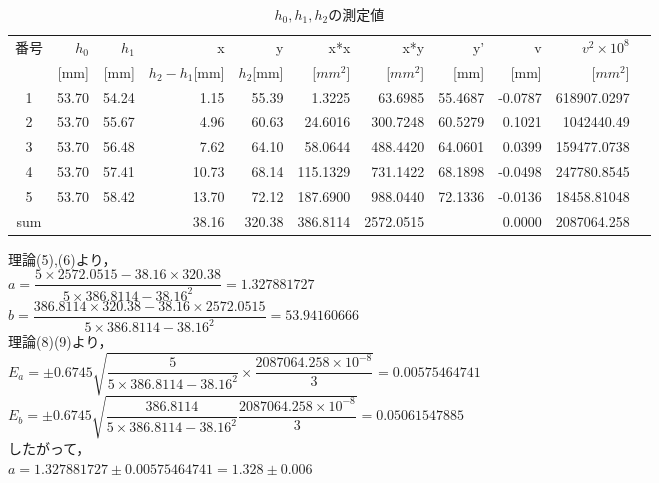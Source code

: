 \documentclass[a4paper,1pt]{jsarticle}
\begin{document}
\begin{table}[H]
  \caption{$h_0,h_1,h_2$の測定値}
  \label{table:SpeedOfLight}
  \centering
  \begin{tabular}{|c||r|r|r|r|r|r|r|r|r|r|}
    \hline
    番号 & $h_0$ & $h_1$ & x & y & x*x & x*y & y' & v & $v^2\times10^8$\\
    &[mm] & [mm] & $h_2-h_1$[mm] & $h_2$[mm] & [$mm^2$] & [$mm^2$] & [mm] & [mm] & [$mm^2$]\\
    \hline \hline
    1 & 53.70 & 54.24 & 1.15 & 55.39 & 1.3225 & 63.6985 & 55.4687 & -0.0787 & 618907.0297 \\
    2 & 53.70 & 55.67 & 4.96 & 60.63 & 24.6016 & 300.7248 & 60.5279 & 0.1021 & 1042440.49 \\
    3 & 53.70 & 56.48 & 7.62 & 64.10 & 58.0644 & 488.4420 & 64.0601 & 0.0399 & 159477.0738 \\
    4 & 53.70 & 57.41 & 10.73 & 68.14 & 115.1329 & 731.1422 & 68.1898 & -0.0498 & 247780.8545 \\
    5 & 53.70 & 58.42 & 13.70 & 72.12 & 187.6900 & 988.0440 & 72.1336 & -0.0136 & 18458.81048 \\
    \hline
    sum &  &  & 38.16 & 320.38 & 386.8114 & 2572.0515 &  & 0.0000 & 2087064.258 \\
    \hline
  \end{tabular}


\end{table}

理論(5),(6)より，\\

$a=\dfrac{5\times2572.0515-38.16\times320.38}{5\times386.8114-38.16^2}=1.327881727$\\

$b=\dfrac{386.8114\times320.38-38.16\times2572.0515}{5\times386.8114-38.16^2}=53.94160666$\\

理論(8)(9)より，\\

$E_a=\pm0.6745\sqrt{\dfrac{5}{5\times386.8114-38.16^2}\times\dfrac{2087064.258\times10^{-8}}{3}}=0.00575464741$\\

$E_b=\pm0.6745\sqrt{\dfrac{386.8114}{5\times386.8114-38.16^2}\dfrac{2087064.258\times10^{-8}}{3}}=0.05061547885$\\

したがって，\\

$a=1.327881727\pm0.00575464741=1.328\pm0.006$\\
\end{document}

